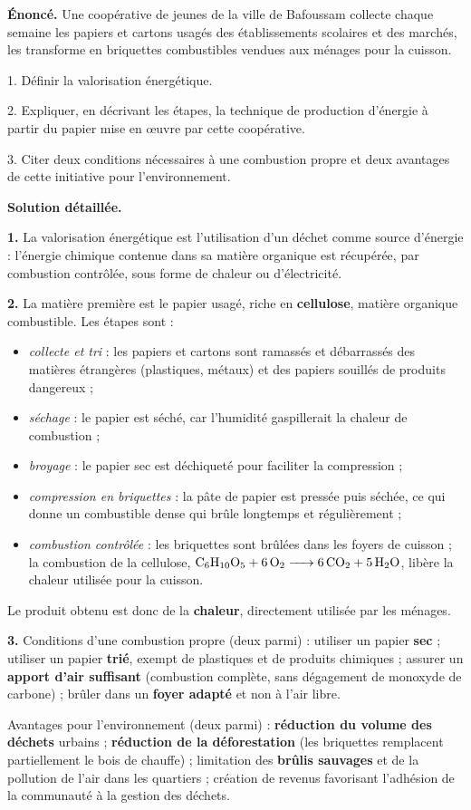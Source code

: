 \documentclass[11pt]{article}
\begin{document}
\begin{exoresolu}
\textbf{Énoncé.} Une coopérative de jeunes de la ville de Bafoussam collecte chaque semaine les papiers et cartons usagés des établissements scolaires et des marchés, les transforme en briquettes combustibles vendues aux ménages pour la cuisson.

1. Définir la valorisation énergétique.

2. Expliquer, en décrivant les étapes, la technique de production d'énergie à partir du papier mise en œuvre par cette coopérative.

3. Citer deux conditions nécessaires à une combustion propre et deux avantages de cette initiative pour l'environnement.

\tcblower
\textbf{Solution détaillée.}

\textbf{1.} La valorisation énergétique est l'utilisation d'un déchet comme source d'énergie : l'énergie chimique contenue dans sa matière organique est récupérée, par combustion contrôlée, sous forme de chaleur ou d'électricité.

\textbf{2.} La matière première est le papier usagé, riche en \textbf{cellulose}, matière organique combustible. Les étapes sont :
\begin{itemize}
\item \emph{collecte et tri} : les papiers et cartons sont ramassés et débarrassés des matières étrangères (plastiques, métaux) et des papiers souillés de produits dangereux ;
\item \emph{séchage} : le papier est séché, car l'humidité gaspillerait la chaleur de combustion ;
\item \emph{broyage} : le papier sec est déchiqueté pour faciliter la compression ;
\item \emph{compression en briquettes} : la pâte de papier est pressée puis séchée, ce qui donne un combustible dense qui brûle longtemps et régulièrement ;
\item \emph{combustion contrôlée} : les briquettes sont brûlées dans les foyers de cuisson ; la combustion de la cellulose, $\ce{C6H10O5 + 6O2 -> 6CO2 + 5H2O}$, libère la chaleur utilisée pour la cuisson.
\end{itemize}
Le produit obtenu est donc de la \textbf{chaleur}, directement utilisée par les ménages.

\textbf{3.} Conditions d'une combustion propre (deux parmi) : utiliser un papier \textbf{sec} ; utiliser un papier \textbf{trié}, exempt de plastiques et de produits chimiques ; assurer un \textbf{apport d'air suffisant} (combustion complète, sans dégagement de monoxyde de carbone) ; brûler dans un \textbf{foyer adapté} et non à l'air libre.

Avantages pour l'environnement (deux parmi) : \textbf{réduction du volume des déchets} urbains ; \textbf{réduction de la déforestation} (les briquettes remplacent partiellement le bois de chauffe) ; limitation des \textbf{brûlis sauvages} et de la pollution de l'air dans les quartiers ; création de revenus favorisant l'adhésion de la communauté à la gestion des déchets.
\end{exoresolu}
\end{document}
